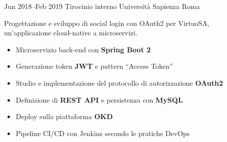 \documentclass[11pt,a4paper,sans]{moderncv} %
\begin{document}
\cventry
  {Jun 2018--Feb 2019}                 %
  {Tirocinio interno}                  %
  {Università Sapienza}                %
  {Roma}                               %
  {}                                   %
  {                                    %
    Progettazione e sviluppo di social login con OAuth2 per VirtuoSA,
    un'applicazione cloud-native a microservizi.
    \begin{itemize}
      \item Microservizio back-end con \textbf{Spring Boot 2}
      \item Generazione token \textbf{JWT} e pattern “Access Token”
      \item Studio e implementazione del protocollo di autorizzazione \textbf{OAuth2}
      \item Definizione di \textbf{REST API} e persistenza con \textbf{MySQL}
      \item Deploy sulla piattaforma \textbf{OKD}
      \item Pipeline CI/CD con Jenkins secondo le pratiche DevOps
    \end{itemize}
  }


\end{document}
